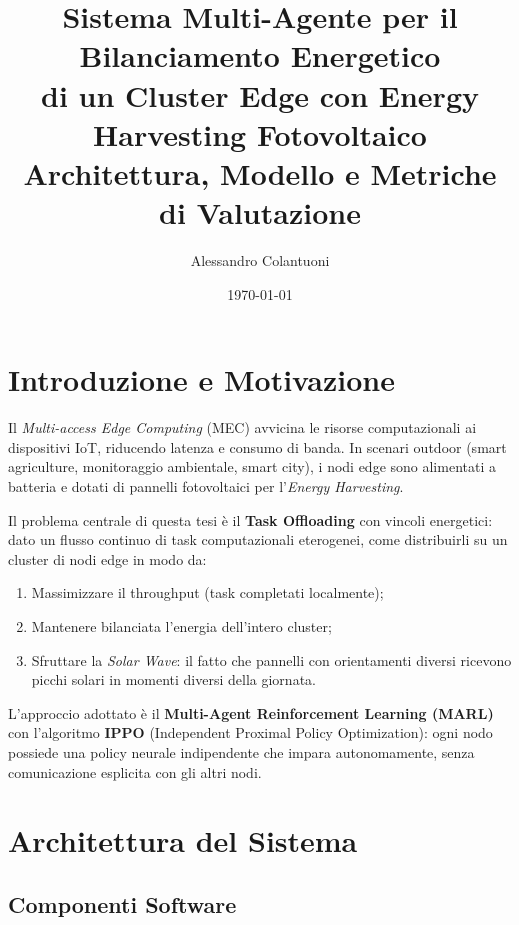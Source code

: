 \documentclass[11pt,a4paper]{article}
\title{\textbf{Sistema Multi-Agente per il Bilanciamento Energetico\\di un Cluster Edge con Energy Harvesting Fotovoltaico}\\[0.5em]\large Architettura, Modello e Metriche di Valutazione}
\author{Alessandro Colantuoni}
\date{\today}
\begin{document}
\maketitle
\tableofcontents
\newpage

\section{Introduzione e Motivazione}

Il \emph{Multi-access Edge Computing} (MEC) avvicina le risorse computazionali ai dispositivi IoT, riducendo latenza e consumo di banda. In scenari outdoor (smart agriculture, monitoraggio ambientale, smart city), i nodi edge sono alimentati a batteria e dotati di pannelli fotovoltaici per l'\emph{Energy Harvesting}.

Il problema centrale di questa tesi \`e il \textbf{Task Offloading} con vincoli energetici: dato un flusso continuo di task computazionali eterogenei, come distribuirli su un cluster di nodi edge in modo da:
\begin{enumerate}[nosep]
    \item Massimizzare il throughput (task completati localmente);
    \item Mantenere bilanciata l'energia dell'intero cluster;
    \item Sfruttare la \emph{Solar Wave}: il fatto che pannelli con orientamenti diversi ricevono picchi solari in momenti diversi della giornata.
\end{enumerate}

L'approccio adottato \`e il \textbf{Multi-Agent Reinforcement Learning (MARL)} con l'algoritmo \textbf{IPPO} (Independent Proximal Policy Optimization): ogni nodo possiede una policy neurale indipendente che impara autonomamente, senza comunicazione esplicita con gli altri nodi.

\section{Architettura del Sistema}

\subsection{Componenti Software}
\end{document}
